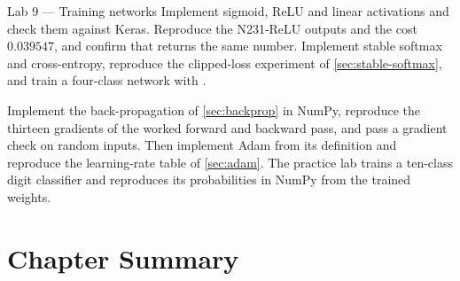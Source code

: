 \begin{labbox}{Lab 9 --- Training networks}
Implement sigmoid, ReLU and linear activations and check them against Keras.
Reproduce the N231-ReLU outputs and the cost $0.039547$, and confirm that
 returns the same number. Implement stable softmax and
cross-entropy, reproduce the clipped-loss experiment of
\cref{sec:stable-softmax}, and train a four-class network with
.

Implement the back-propagation of \cref{sec:backprop} in NumPy, reproduce the
thirteen gradients of the worked forward and backward pass, and pass a gradient
check on random inputs. Then implement Adam from its definition and reproduce
the learning-rate table of \cref{sec:adam}. The practice lab trains a ten-class
digit classifier and reproduces its probabilities in NumPy from the trained
weights.
\end{labbox}

\section*{Chapter Summary}


